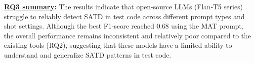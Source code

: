\begin{tcolorbox}
\noindent\textbf{\underline{RQ3 summary}:}
The results indicate that open-source LLMs (Flan-T5 series) struggle to reliably detect SATD in test code across different prompt types and shot settings. Although the best F1-score reached 0.68 using the MAT prompt, the overall performance remains inconsistent and relatively poor compared to the existing tools (RQ2), suggesting that these models have a limited ability to understand and generalize SATD patterns in test code.
\end{tcolorbox}
